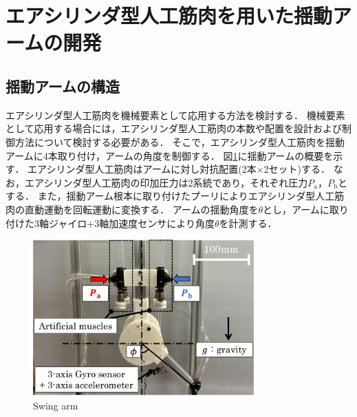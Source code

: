 \section{エアシリンダ型人工筋肉を用いた揺動アームの開発}%
\subsection{揺動アームの構造}
エアシリンダ型人工筋肉を機械要素として応用する方法を検討する．
機械要素として応用する場合には，エアシリンダ型人工筋肉の本数や配置を設計および制御方法について検討する必要がある．
そこで，エアシリンダ型人工筋肉を揺動アームに4本取り付け，アームの角度を制御する．
図\ref{Swing arm}に揺動アームの概要を示す．
エアシリンダ型人工筋肉はアームに対し対抗配置(2本×2セット)する．
なお，エアシリンダ型人工筋肉の印加圧力は2系統であり，それぞれ圧力$P_\mathrm{a}$，$P_\mathrm{b}$とする．
また，揺動アーム根本に取り付けたプーリによりエアシリンダ型人工筋肉の直動運動を回転運動に変換する．
アームの揺動角度を$\theta$とし，アームに取り付けた3軸ジャイロ+3軸加速度センサにより角度$\theta$を計測する．
\begin{figure}[t]
  \centering
  \includegraphics[width=85mm]{_pdf/swing_arm.pdf}
  \caption{Swing arm}
  \label{Swing arm}
\end{figure}


